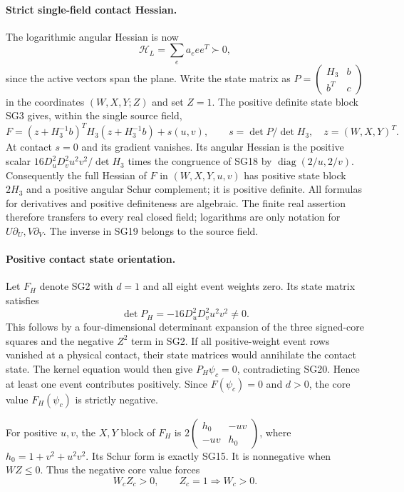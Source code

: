 \paragraph{Strict single-field contact Hessian.}
The logarithmic angular Hessian is now
\[
                 \mathcal H_L=\sum_e a_e ee^T\succ0,       \tag{SG18}
\]
since the active vectors span the plane.  Write the state matrix
as $P=\left(\begin{smallmatrix}H_3&b\\b^T&c\end{smallmatrix}\right)$
in the coordinates $(W,X,Y;Z)$ and set $Z=1$.
The positive definite state block SG3 gives, within the single
source field,
\[
 F=(z+H_3^{-1}b)^TH_3(z+H_3^{-1}b)+s(u,v),
 \qquad s=\det P/\det H_3,\quad z=(W,X,Y)^T.             \tag{SG19}
\]
At contact $s=0$ and its gradient vanishes.  Its angular Hessian
is the positive scalar $16D_u^2D_v^2u^2v^2/\det H_3$ times
the congruence of SG18 by $\operatorname{diag}(2/u,2/v)$.
Consequently the full Hessian of $F$ in $(W,X,Y,u,v)$ has
positive state block $2H_3$ and a positive angular Schur complement;
it is positive definite.  All formulas for derivatives and
positive definiteness are algebraic.  The finite real assertion
therefore transfers to every real closed field; logarithms are
only notation for $U\partial_U,V\partial_V$.
The inverse in SG19 belongs to the source field.

\paragraph{Positive contact state orientation.}
Let $F_H$ denote SG2 with $d=1$ and all eight event weights zero.
Its state matrix satisfies
\[
              \det P_H=-16D_u^2D_v^2u^2v^2\ne0.          \tag{SG20}
\]
This follows by a four-dimensional determinant expansion of the
three signed-core squares and the negative $Z^2$ term in SG2.
If all positive-weight event rows vanished at a physical contact,
their state matrices would annihilate the contact state.  The
kernel equation would then give $P_H\psi_c=0$, contradicting
SG20.  Hence at least one event contributes positively.  Since
$F(\psi_c)=0$ and $d>0$, the core value $F_H(\psi_c)$ is strictly
negative.

For positive $u,v$, the $X,Y$ block of $F_H$ is
$2\left(\begin{smallmatrix}h_0&-uv\\-uv&h_0\end{smallmatrix}\right)$,
where $h_0=1+v^2+u^2v^2$.  Its Schur form is exactly SG15.
It is nonnegative when $WZ\le0$.  Thus the negative core value
forces
\[
                  W_cZ_c>0,\qquad Z_c=1\Longrightarrow W_c>0.
                                                               \tag{SG21}
\]

